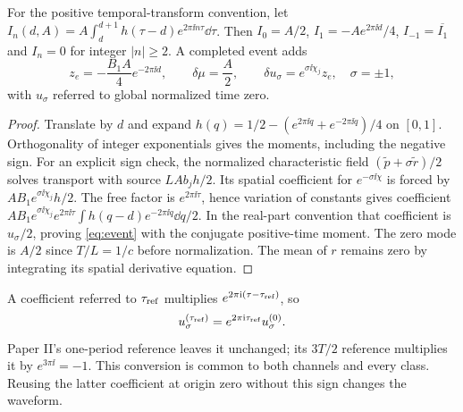 \begin{proposition}\label{prop:moments}
For the positive temporal-transform convention, let
$I_n(d,A)=A\int_d^{d+1}h(\tau-d)e^{2\pi\ii n\tau}\dd\tau$.
Then $I_0=A/2$, $I_1=-Ae^{2\pi\ii d}/4$, $I_{-1}=\overline{I_1}$ and $I_n=0$ for integer $|n|\ge2$. A completed event adds
\begin{equation}\label{eq:event}
 z_e=-\frac{B_1A}{4}e^{-2\pi\ii d},\qquad
 \delta\mu=\frac A2,\qquad
 \delta u_\sigma=e^{\sigma\ii\chi_j}z_e,\quad \sigma=\pm1,
\end{equation}
with $u_\sigma$ referred to global normalized time zero.
\end{proposition}
\begin{proof}
Translate by $d$ and expand $h(q)=1/2-(e^{2\pi\ii q}+e^{-2\pi\ii q})/4$ on $[0,1]$. Orthogonality of integer exponentials gives the moments, including the negative sign. For an explicit sign check, the normalized characteristic field $(\widetilde p+\sigma\widetilde r)/2$ solves transport with source $LA b_jh/2$. Its spatial coefficient for $e^{-\sigma\ii\chi}$ is forced by $AB_1e^{\sigma\ii\chi_j}h/2$. The free factor is $e^{2\pi\ii\tau}$, hence variation of constants gives coefficient
$AB_1e^{\sigma\ii\chi_j}e^{2\pi\ii\tau}\int h(q-d)e^{-2\pi\ii q}\dd q/2$.
In the real-part convention that coefficient is $u_\sigma/2$, proving \eqref{eq:event} with the conjugate positive-time moment. The zero mode is $A/2$ since $T/L=1/c$ before normalization. The mean of $r$ remains zero by integrating its spatial derivative equation.
\end{proof}
A coefficient referred to $\tau_{\rm ref}$ multiplies $e^{2\pi\mathrm i(\tau-\tau_{\rm ref})}$, so
\begin{equation}\label{eq:phase}
 u_\sigma^{(\tau_{\rm ref})}=e^{2\pi\mathrm i\tau_{\rm ref}}u_\sigma^{(0)}.
\end{equation}
Paper II's one-period reference leaves it unchanged; its $3T/2$ reference multiplies it by $e^{3\pi\ii}=-1$. This conversion is common to both channels and every class. Reusing the latter coefficient at origin zero without this sign changes the waveform.

